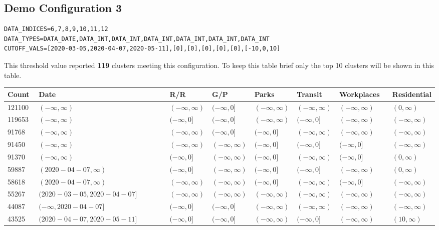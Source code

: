 \documentclass{article}
\begin{document}
\subsection{Demo Configuration 3}
\begin{center}
\footnotesize{
\begin{lstlisting}
DATA_INDICES=6,7,8,9,10,11,12
DATA_TYPES=DATA_DATE,DATA_INT,DATA_INT,DATA_INT,DATA_INT,DATA_INT,DATA_INT
CUTOFF_VALS=[2020-03-05,2020-04-07,2020-05-11],[0],[0],[0],[0],[0],[-10,0,10]
\end{lstlisting}
}
\end{center}
This threshold value reported \textbf{119} clusters meeting this configuration.  To keep this table brief only the top 10 clusters will be shown in this table.

\hfill
\begin{adjustbox}{width=\textwidth,totalheight=\textheight,keepaspectratio,rotate=0,caption={Demo Configuration 3 - Results},nofloat=table}
\begin{tabular}{ |p{0.08\linewidth}|p{0.38\linewidth}|p{0.1\linewidth}|p{0.1\linewidth}|p{0.1\linewidth}|p{0.1\linewidth}|p{0.15\linewidth}|p{0.15\linewidth}| }
\hline
Count&Date&R/R&G/P&Parks&Transit&Workplaces&Residential \\
\hline
121100&\((-\infty,\infty)\)&\((-\infty,\infty)\)&\((-\infty,0]\)&\((-\infty,\infty)\)&\((-\infty,\infty)\)&\((-\infty,\infty)\)&\((0,\infty)\) \\
\hline
119653&\((-\infty,\infty)\)&\((-\infty,0]\)&\((-\infty,0]\)&\((-\infty,\infty)\)&\((-\infty,0]\)&\((-\infty,\infty)\)&\((-\infty,\infty)\) \\
\hline
91768&\((-\infty,\infty)\)&\((-\infty,\infty)\)&\((-\infty,0]\)&\((-\infty,0]\)&\((-\infty,\infty)\)&\((-\infty,\infty)\)&\((-\infty,\infty)\) \\
\hline
91450&\((-\infty,\infty)\)&\((-\infty,\infty)\)&\((-\infty,\infty)\)&\((-\infty,0]\)&\((-\infty,0]\)&\((-\infty,0]\)&\((-\infty,\infty)\) \\
\hline
91370&\((-\infty,\infty)\)&\((-\infty,0]\)&\((-\infty,\infty)\)&\((-\infty,0]\)&\((-\infty,\infty)\)&\((-\infty,0]\)&\((0,\infty)\) \\
\hline
59887&\((2020-04-07,\infty)\)&\((-\infty,0]\)&\((-\infty,\infty)\)&\((-\infty,0]\)&\((-\infty,0]\)&\((-\infty,\infty)\)&\((0,\infty)\) \\
\hline
58618&\((2020-04-07,\infty)\)&\((-\infty,\infty)\)&\((-\infty,\infty)\)&\((-\infty,0]\)&\((-\infty,\infty)\)&\((-\infty,0]\)&\((-\infty,\infty)\) \\
\hline
55267&\((2020-03-05,2020-04-07]\)&\((-\infty,\infty)\)&\((-\infty,\infty)\)&\((-\infty,\infty)\)&\((-\infty,\infty)\)&\((-\infty,\infty)\)&\((-\infty,\infty)\) \\
\hline
44087&\((-\infty,2020-04-07]\)&\((-\infty,0]\)&\((-\infty,0]\)&\((-\infty,\infty)\)&\((-\infty,\infty)\)&\((-\infty,\infty)\)&\((-\infty,\infty)\) \\
\hline
43525&\((2020-04-07,2020-05-11]\)&\((-\infty,0]\)&\((-\infty,0]\)&\((-\infty,\infty)\)&\((-\infty,0]\)&\((-\infty,\infty)\)&\((10,\infty)\) \\
\hline
\end{tabular}
\end{adjustbox}
\end{document}
